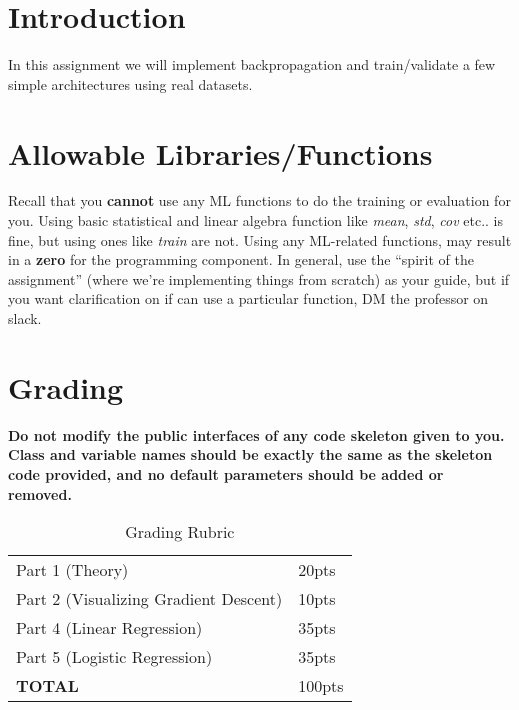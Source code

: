 \documentclass[12pt]{article}
\begin{document}
\maketitle


\section*{Introduction}
In this assignment we will implement backpropagation and train/validate a few simple architectures using real datasets.\\

\section*{Allowable Libraries/Functions}
Recall that you \textbf{cannot} use any ML functions to do the training or evaluation for you.  Using basic statistical and linear algebra function like \emph{mean}, \emph{std}, \emph{cov} etc.. is fine, but using ones like \emph{train} are not. Using any ML-related functions, may result in a \textbf{zero} for the programming component.  In general, use the ``spirit of the assignment'' (where we're implementing things from scratch) as your guide, but if you want clarification on if can use a particular function, DM the professor on slack.



\section*{Grading}
\textbf{Do not modify the public interfaces of any code skeleton given to you. Class and variable names should be exactly the same as the skeleton code provided, and no default parameters should be added or removed.}
\begin{table}[h]
\begin{center}
\begin{tabular}{|l|l|}
\hline
Part 1 (Theory) & 20pts\\
Part 2 (Visualizing Gradient Descent) & 10pts\\
Part 4 (Linear Regression) & 35pts\\
Part 5 (Logistic Regression) & 35pts\\
\hline
\textbf{TOTAL} & 100pts \\
\hline
\end{tabular}
\caption{Grading Rubric}
\end{center}
\end{table}
\end{document}
